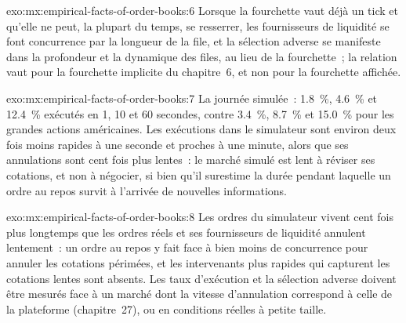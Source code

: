 \begin{solution}{exo:mx:empirical-facts-of-order-books:6}
Lorsque la fourchette vaut déjà un tick et qu'elle ne peut, la plupart du temps, se resserrer, les fournisseurs de liquidité se font concurrence par la longueur de la file, et la sélection adverse se manifeste
dans la profondeur et la dynamique des files, au lieu de la fourchette~; la relation vaut pour la fourchette implicite du chapitre~6, et non pour la fourchette affichée.
\end{solution}

\begin{solution}{exo:mx:empirical-facts-of-order-books:7}
La journée simulée~: 1.8~\%, 4.6~\% et 12.4~\% exécutés en 1, 10 et 60 secondes, contre 3.4~\%, 8.7~\% et 15.0~\% pour les grandes actions américaines. Les exécutions dans le
simulateur sont environ deux fois moins rapides à une seconde et proches à une minute, alors que ses annulations sont cent fois plus lentes~: le marché simulé est lent à
réviser ses cotations, et non à négocier, si bien qu'il surestime la durée pendant laquelle un ordre au repos survit à l'arrivée de nouvelles informations.
\end{solution}

\begin{solution}{exo:mx:empirical-facts-of-order-books:8}
Les ordres du simulateur vivent cent fois plus longtemps que les ordres réels et ses fournisseurs de liquidité annulent lentement~: un ordre au repos y fait face à bien moins
de concurrence pour annuler les cotations périmées, et les intervenants plus rapides qui capturent les cotations lentes sont absents. Les taux d'exécution et la sélection adverse doivent être mesurés face à un
marché dont la vitesse d'annulation correspond à celle de la plateforme (chapitre~27), ou en conditions réelles à petite taille.
\end{solution}

